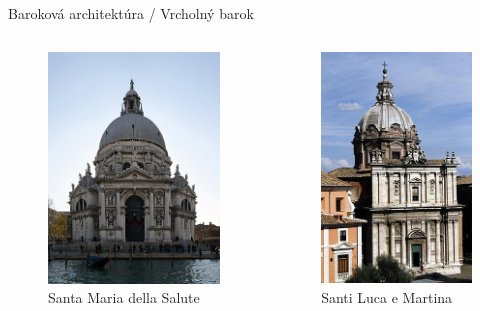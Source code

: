 \documentclass[dvipsnames]{beamer}
\begin{document}
\begin{frame}{\small \textcolor{g}{Baroková architektúra} / \Large Vrcholný barok}
\begin{itemize}
\begin{columns}
\begin{figure}
				      \includegraphics[scale=0.225]{salute}
				      \caption{Santa Maria della Salute}
			      \end{figure}%
			      \begin{figure}
				      \includegraphics[scale=0.225]{slem}
				      \caption{ Santi Luca e Martina}
			      \end{figure}


		      \end{columns}
	\end{itemize}
\end{frame}
\end{document}
